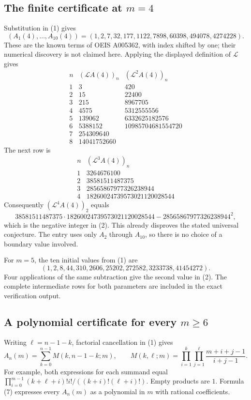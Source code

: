 \documentclass[11pt]{article}
\newcommand{\LL}{\mathcal L}
\begin{document}
\subsection*{The finite certificate at $m=4$}
Substitution in (1) gives
\[
 (A_1(4),\ldots,A_{10}(4))=
 (1,2,7,32,177,1122,7898,60398,494078,4274228).
                                                               \tag{3}
\]
These are the known terms of OEIS A005362, with index shifted
by one; their numerical discovery is not claimed here.
Applying the displayed definition of $\LL$ gives
\[
\begin{array}{c|r|r}
n&(\LL A(4))_n&(\LL^2 A(4))_n\\\hline
1&3&420\\
2&15&22400\\
3&215&8967705\\
4&4575&5312555556\\
5&139062&6332625182576\\
6&5388152&10985704681554720\\
7&254309640&\\
8&14041752660&
\end{array}                                                  \tag{4}
\]
The next row is
\[
\begin{array}{c|r}
n&(\LL^3 A(4))_n\\\hline
1&3264676100\\
2&38581511487375\\
3&28565867977326238944\\
4&18260024739573021120028544
\end{array}                                                  \tag{5}
\]
Consequently $(\LL^4 A(4))_2$ equals
\[
 38581511487375\cdot18260024739573021120028544
 -28565867977326238944^2,
\]
which is the negative integer in (2). This already disproves
the stated universal conjecture. The entry uses only $A_2$ through
$A_{10}$, so there is no choice of a boundary value involved.

For $m=5$, the ten initial values from (1) are
\[
 (1,2,8,44,310,2606,25202,272582,3233738,41454272).
                                                               \tag{6}
\]
Four applications of the same subtraction give the second value
in (2). The complete intermediate rows for both parameters are
included in the exact verification output.

\subsection*{A polynomial certificate for every $m\ge6$}
Writing $\ell=n-1-k$, factorial cancellation in (1) gives
\[
 A_n(m)=\sum_{k=0}^{n-1}M(k,n-1-k;m),\qquad
 M(k,\ell;m)=\prod_{i=1}^k\prod_{j=1}^{\ell}
                \frac{m+i+j-1}{i+j-1}.                       \tag{7}
\]
For example, both expressions for each summand equal
$\prod_{i=0}^{m-1}(k+\ell+i)!i!/((k+i)!(\ell+i)!)$.
Empty products are $1$. Formula (7) expresses every $A_n(m)$
as a polynomial in $m$ with rational coefficients.
\end{document}
